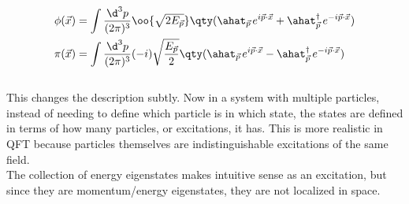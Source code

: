 \begin{align}
	\phi(\vec{x})&=\int
	\frac{\d^3p}{(2\pi)^3}
	\oo{\sqrt{2E_{\vec{p}}}}
	\qty(
		\ahat_{\ppp}e^{i\vec{p}\cdot\vec{x}}
		+
		\ahat_{\vec{p}}^{\dagger}\,e^{-i\vec{p}\cdot\vec{x}}
	)
	\\
	\pi(\vec{x})&=\int\frac{\d^3p}{(2\pi)^3}
	(-i)\sqrt{\frac{E_{\vec{p}}}{2}}
	\qty(
		\ahat_{\ppp}e^{i\vec{p}\cdot\vec{x}}
		-
		\ahat_{\vec{p}}^{\dagger}\,e^{-i\vec{p}\cdot\vec{x}}
	)
\end{align}
\\
This changes the description subtly. Now in a system with multiple particles, instead of needing to define which particle is in which state, the states are defined in terms of how many particles, or excitations, it has. This is more realistic in QFT because particles themselves are indistinguishable excitations of the same field.
\\
The collection of energy eigenstates makes intuitive sense as an excitation, but since they are momentum/energy eigenstates, they are not localized in space.  

